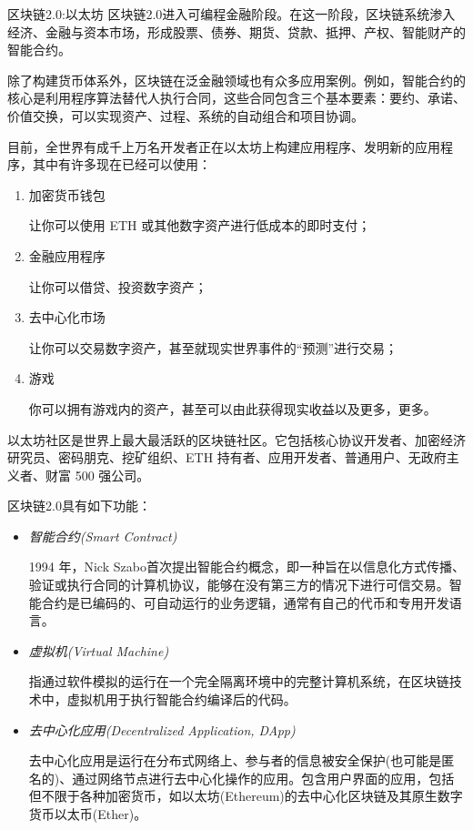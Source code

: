 \documentclass[11pt]{beamer}
\begin{document}
\begin{frame}[allowframebreaks]{区块链2.0:以太坊}
	区块链2.0进入可编程金融阶段。在这一阶段，区块链系统渗入经济、金融与资本市场，形成股票、债券、期货、贷款、抵押、产权、智能财产的智能合约。

	除了构建货币体系外，区块链在泛金融领域也有众多应用案例。例如，智能合约的核心是利用程序算法替代人执行合同，这些合同包含三个基本要素：要约、承诺、价值交换，可以实现资产、过程、系统的自动组合和项目协调。

	\newpage

	目前，全世界有成千上万名开发者正在以太坊上构建应用程序、发明新的应用程序，其中有许多现在已经可以使用：
	\begin{enumerate}
		\item 	加密货币钱包

		      {\tiny 让你可以使用 ETH 或其他数字资产进行低成本的即时支付；}

		\item 	金融应用程序

		      {\tiny 让你可以借贷、投资数字资产；}
		\item 	去中心化市场

		      {\tiny 让你可以交易数字资产，甚至就现实世界事件的“预测”进行交易；}
		\item 	游戏

		      {\tiny 你可以拥有游戏内的资产，甚至可以由此获得现实收益以及更多，更多。}
	\end{enumerate}
	{\footnotesize 以太坊社区是世界上最大最活跃的区块链社区。它包括核心协议开发者、加密经济研究员、密码朋克、挖矿组织、ETH 持有者、应用开发者、普通用户、无政府主义者、财富 500 强公司。}

	\newpage

	区块链2.0具有如下功能：
	\begin{itemize}
		\item \textsl{智能合约(Smart Contract)}

		      {\tiny 1994 年，Nick Szabo首次提出智能合约概念，即一种旨在以信息化方式传播、验证或执行合同的计算机协议，能够在没有第三方的情况下进行可信交易。智能合约是已编码的、可自动运行的业务逻辑，通常有自己的代币和专用开发语言。}
		\item \textsl{虚拟机(Virtual Machine)}

		      {\tiny 指通过软件模拟的运行在一个完全隔离环境中的完整计算机系统，在区块链技术中，虚拟机用于执行智能合约编译后的代码。}
		\item \textsl{去中心化应用(Decentralized Application, DApp)}

		      {\tiny 去中心化应用是运行在分布式网络上、参与者的信息被安全保护(也可能是匿名的)、通过网络节点进行去中心化操作的应用。包含用户界面的应用，包括但不限于各种加密货币，如以太坊(Ethereum)的去中心化区块链及其原生数字货币以太币(Ether)。}
	\end{itemize}
\end{frame}
\end{document}
